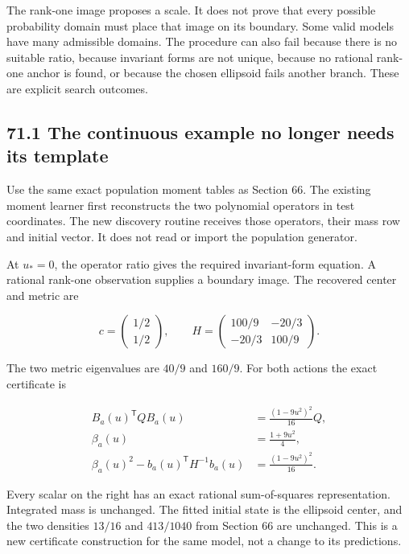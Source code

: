 \documentclass[11pt,letterpaper]{article}
\begin{document}
The rank-one image proposes a scale. It does not prove that every
possible probability domain must place that image on its boundary. Some
valid models have many admissible domains. The procedure can also fail
because there is no suitable ratio, because invariant forms are not
unique, because no rational rank-one anchor is found, or because the
chosen ellipsoid fails another branch. These are explicit search
outcomes.

\subsection{71.1 The continuous example no longer needs its
template}\label{the-continuous-example-no-longer-needs-its-template}

Use the same exact population moment tables as Section 66. The existing
moment learner first reconstructs the two polynomial operators in test
coordinates. The new discovery routine receives those operators, their
mass row and initial vector. It does not read
 or import the population generator.

At \(u_*=0\), the operator ratio gives the required invariant-form
equation. A rational rank-one observation supplies a boundary image. The
recovered center and metric are

\[
\boxed{
c=\begin{pmatrix}1/2\\1/2\end{pmatrix},\qquad
H=\begin{pmatrix}100/9&-20/3\\-20/3&100/9\end{pmatrix}.
}
\]

The two metric eigenvalues are \(40/9\) and \(160/9\). For both actions
the exact certificate is

\[
\begin{aligned}
B_a(u)^{\mathsf T}QB_a(u)&=\frac{(1-9u^2)^2}{16}Q,\\
\beta_a(u)&=\frac{1+9u^2}{4},\\
\beta_a(u)^2-b_a(u)^{\mathsf T}H^{-1}b_a(u)
&=\frac{(1-9u^2)^2}{16}.
\end{aligned}
\]

Every scalar on the right has an exact rational sum-of-squares
representation. Integrated mass is unchanged. The fitted initial state
is the ellipsoid center, and the two densities \(13/16\) and
\(413/1040\) from Section 66 are unchanged. This is a new certificate
construction for the same model, not a change to its predictions.
\end{document}
